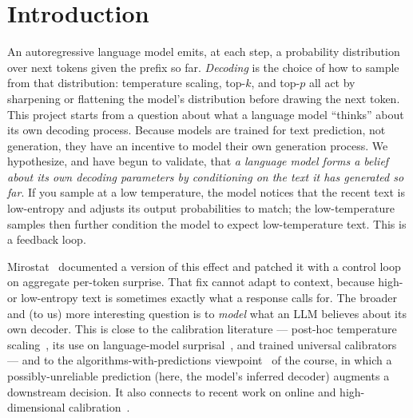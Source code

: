 \documentclass[11pt]{article}
\begin{document}
\section{Introduction}
An autoregressive language model emits, at each step, a probability
distribution over next tokens given the prefix so far. \emph{Decoding} is the
choice of how to sample from that distribution: temperature scaling, top-$k$,
and top-$p$ all act by sharpening or flattening the model's distribution before
drawing the next token. This project starts from a question about what a
language model ``thinks'' about its own decoding process. Because models are
trained for text prediction, not generation, they have an incentive to model
their own generation process. We hypothesize, and have begun to validate, that
\emph{a language model forms a belief about its own decoding parameters by
conditioning on the text it has generated so far}. If you sample at a low
temperature, the model notices that the recent text is low-entropy and adjusts
its output probabilities to match; the low-temperature samples then further
condition the model to expect low-temperature text. This is a feedback loop.

Mirostat~\citep{basu2021mirostat} documented a version of this effect and
patched it with a control loop on aggregate per-token surprise. That fix cannot
adapt to context, because high- or low-entropy text is sometimes exactly what a
response calls for. The broader and (to us) more interesting question is to
\emph{model} what an LLM believes about its own decoder. This is close to the
calibration literature --- post-hoc temperature scaling~\citep{guo2017calibration},
its use on language-model surprisal~\citep{liu2024temperature}, and trained
universal calibrators~\citep{shen2024thermometer} --- and to the
algorithms-with-predictions viewpoint~\citep{mitzenmacher2020algorithms} of the
course, in which a possibly-unreliable prediction (here, the model's inferred
decoder) augments a downstream decision. It also connects to recent work on
online and high-dimensional
calibration~\citep{peng2025calibration,fishelson2025calibration}.
\end{document}
